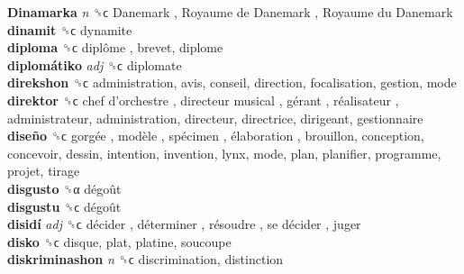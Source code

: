 \textbf{Dinamarka} \emph{n}  ␝ϲ   Danemark ,  Royaume de Danemark ,  Royaume du Danemark   \\
\textbf{dinamit} ␝ϲ  dynamite  \\
\textbf{diploma} ␝ϲ   diplôme , brevet, diplome  \\
\textbf{diplomátiko} \emph{adj}  ␝ϲ  diplomate  \\
\textbf{direkshon} ␝ϲ  administration, avis, conseil, direction, focalisation, gestion, mode  \\
\textbf{direktor} ␝ϲ   chef d’orchestre ,  directeur musical ,  gérant ,  réalisateur , administrateur, administration, directeur, directrice, dirigeant, gestionnaire  \\
\textbf{diseño} ␝ϲ   gorgée ,  modèle ,  spécimen ,  élaboration , brouillon, conception, concevoir, dessin, intention, invention, lynx, mode, plan, planifier, programme, projet, tirage  \\
\textbf{disgusto} ␝α   dégoût   \\
\textbf{disgustu} ␝ϲ   dégoût   \\
\textbf{disidí} \emph{adj}  ␝ϲ   décider ,  déterminer ,  résoudre ,  se décider , juger  \\
\textbf{disko} ␝ϲ  disque, plat, platine, soucoupe  \\
\textbf{diskriminashon} \emph{n}  ␝ϲ  discrimination, distinction  \\
